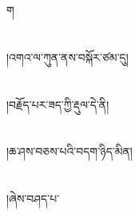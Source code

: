 ག\chapter{ }།འགའ་ལ་ཀུན་ནས་བསྐོར་ཙམ་དུ།\chapter{ }།བརྗོད་པར་ཟད་ཀྱི་རྡུལ་དེ་ནི།\chapter{ }།ཆ་ཤས་བཅས་པའི་བདག་ཉིད་མིན།\chapter{ }།ཞེས་བཤད་པ་